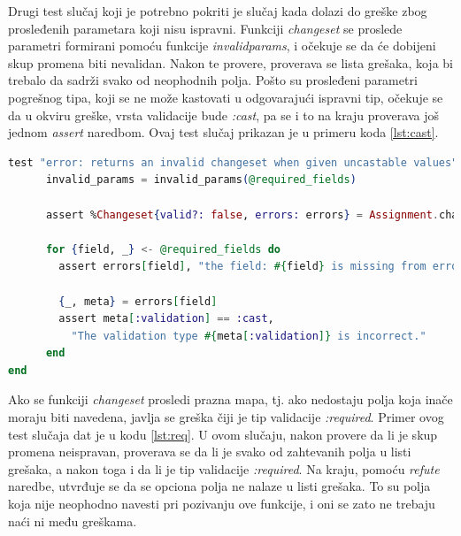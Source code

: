\documentclass[12pt,oneside]{memoir}
\begin{document}
\par Drugi test slučaj koji je potrebno pokriti je slučaj kada dolazi do greške zbog prosleđenih parametara koji nisu ispravni. Funkciji \emph{changeset} se proslede parametri formirani pomoću funkcije \emph{invalid{\textunderscore}params}, i očekuje se da će dobijeni skup promena biti nevalidan. Nakon te provere, proverava se lista grešaka, koja bi trebalo da sadrži svako od neophodnih polja. Pošto su prosleđeni parametri pogrešnog tipa, koji se ne može kastovati u odgovarajući ispravni tip, očekuje se da u okviru greške, vrsta validacije bude \emph{:cast}, pa se i to na kraju proverava još jednom \emph{assert} naredbom. Ovaj test slučaj prikazan je u primeru koda \ref{lst:cast}. 

\begin{lstlisting}[language=elixir, caption={Test slučaj neuspešne upotrebe funkcije \emph{changeset/2}, prosleđivanjem neodgovarajućih parametara},captionpos=b, label={lst:cast}]
test "error: returns an invalid changeset when given uncastable values" do
      invalid_params = invalid_params(@required_fields)

      assert %Changeset{valid?: false, errors: errors} = Assignment.changeset(%Assignment{}, invalid_params)

      for {field, _} <- @required_fields do
        assert errors[field], "the field: #{field} is missing from errors."

        {_, meta} = errors[field]
        assert meta[:validation] == :cast,
          "The validation type #{meta[:validation]} is incorrect."
      end
end
\end{lstlisting}

\par Ako se funkciji \emph{changeset} prosledi prazna mapa, tj. ako nedostaju polja koja inače moraju biti navedena, javlja se greška čiji je tip validacije \emph{:required}. Primer ovog test slučaja dat je u kodu \ref{lst:req}. U ovom slučaju, nakon provere da li je skup promena neispravan, proverava se da li je svako od zahtevanih polja u listi grešaka, a nakon toga i da li je tip validacije \emph{:required}. Na kraju, pomoću \emph{refute} naredbe, utvrđuje se da se opciona polja ne nalaze u listi grešaka. To su polja koja nije neophodno navesti pri pozivanju ove funkcije, i oni se zato ne trebaju naći ni među greškama.
\end{document}
